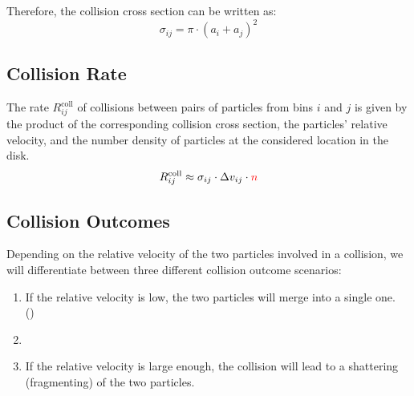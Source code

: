         Therefore, the collision cross section can be written as:
        \begin{equation}
            \sigma_{ij} = \pi \cdot (a_i+a_j)^2
        \end{equation}

    \subsection{Collision Rate}

        The rate $R^\text{coll}_{ij}$ of collisions between pairs of particles from bins $i$ 
        and $j$ is given by the product of the corresponding collision cross section, the
        particles' relative velocity, and the number density of particles at the considered 
        location in the disk. 
        \begin{equation}                                            %
            R^\text{coll}_{ij}
                \approx \sigma_{ij} \cdot \Delta v_{ij} \cdot \textcolor{red}{n}
        \end{equation}


        

    \subsection{Collision Outcomes}

        Depending on the relative velocity of the two particles involved in a collision,
        we will differentiate between three different collision outcome scenarios:
        \begin{enumerate}
            \item If the relative velocity is low, the two particles will merge into a single one.
                \\ ()
            \item {}
            \item If the relative velocity is large enough, the collision will lead to a shattering 
                (fragmenting) of the two particles.
        \end{enumerate}

